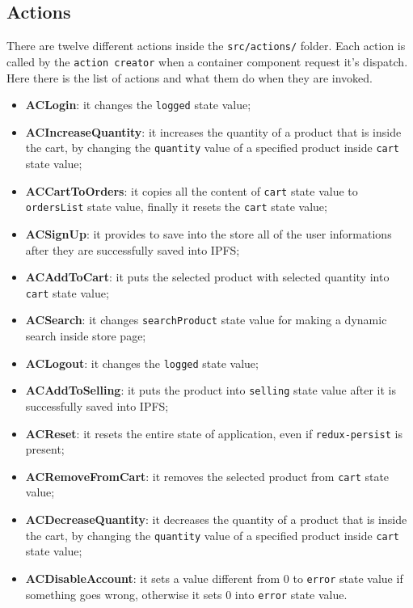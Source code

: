 \subsection{Actions}
There are twelve different actions inside the \texttt{src/actions/} folder. Each action is called by the \texttt{action creator} when a container component request it's dispatch. Here there is the list of actions and what them do when they are invoked.
\begin{itemize}
	\item \textbf{ACLogin}: it changes the \texttt{logged} state value;
	\item \textbf{ACIncreaseQuantity}: it increases the quantity of a product that is inside the cart, by changing the \texttt{quantity} value of a specified product inside \texttt{cart} state value;
	\item \textbf{ACCartToOrders}: it copies all the content of \texttt{cart} state value to \texttt{ordersList} state value, finally it resets the \texttt{cart} state value;
	\item \textbf{ACSignUp}: it provides to save into the store all of the user informations after they are successfully saved into IPFS\glo;
	\item \textbf{ACAddToCart}: it puts the selected product with selected quantity into \texttt{cart} state value;
	\item \textbf{ACSearch}: it changes \texttt{searchProduct} state value for making a dynamic search inside store page;
	\item \textbf{ACLogout}: it changes the \texttt{logged} state value;
	\item \textbf{ACAddToSelling}: it puts the product into \texttt{selling} state value after it is successfully saved into IPFS;
	\item \textbf{ACReset}: it resets the entire state of application, even if \texttt{redux-persist} is present;
	\item \textbf{ACRemoveFromCart}: it removes the selected product from \texttt{cart} state value;
	\item \textbf{ACDecreaseQuantity}: it decreases the quantity of a product that is inside the cart, by changing the \texttt{quantity} value of a specified product inside \texttt{cart} state value;
	\item \textbf{ACDisableAccount}: it sets a value different from 0 to \texttt{error} state value if something goes wrong, otherwise it sets 0 into \texttt{error} state value.
\end{itemize}
